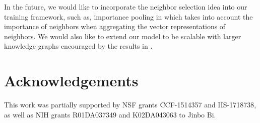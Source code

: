 \documentclass[letterpaper]{article} \usepackage{aaai19}  \usepackage{times}  \usepackage{helvet}  \usepackage{courier}  \usepackage{url}  \usepackage{graphicx}  \usepackage{amsmath}
\begin{document}
In the future, we would like to incorporate the neighbor selection idea into our training framework, such as, importance pooling in \cite{ying2018kdd} which takes into account the importance of neighbors when aggregating
the vector representations of neighbors. We would also like to extend our model to be scalable with larger knowledge graphs encouraged by the results in \cite{ying2018kdd}.

\section{Acknowledgements}
This work was partially supported by NSF grants CCF-1514357 and IIS-1718738, as well as NIH grants R01DA037349 and K02DA043063 to Jinbo Bi.



\end{document}
